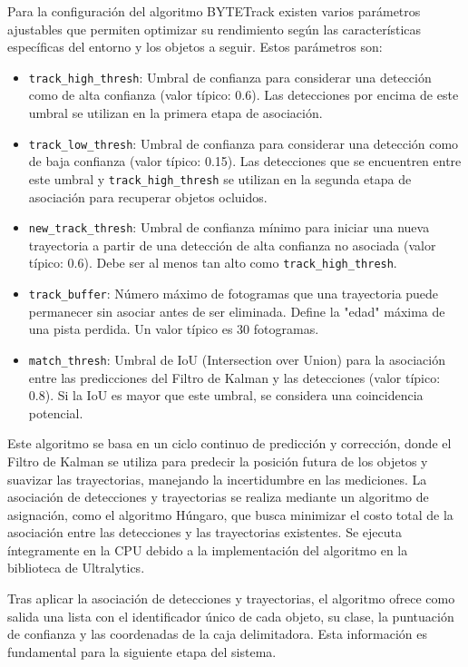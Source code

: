 \documentclass[11pt,spanish,listoffigures,listoftables]{tfgetsinf}
\begin{document}
Para la configuración del algoritmo BYTETrack existen varios parámetros ajustables que permiten optimizar su rendimiento según las características específicas del entorno y los objetos a seguir. Estos parámetros son:
\begin{itemize}
   \item \texttt{track\_high\_thresh}: Umbral de confianza para considerar una detección como de alta confianza (valor típico: 0.6). Las detecciones por encima de este umbral se utilizan en la primera etapa de asociación.
   \item \texttt{track\_low\_thresh}: Umbral de confianza para considerar una detección como de baja confianza (valor típico: 0.15). Las detecciones que se encuentren entre este umbral y \texttt{track\_high\_thresh} se utilizan en la segunda etapa de asociación para recuperar objetos ocluidos.
   \item \texttt{new\_track\_thresh}: Umbral de confianza mínimo para iniciar una nueva trayectoria a partir de una detección de alta confianza no asociada (valor típico: 0.6). Debe ser al menos tan alto como \texttt{track\_high\_thresh}.
   \item \texttt{track\_buffer}: Número máximo de fotogramas que una trayectoria puede permanecer sin asociar antes de ser eliminada. Define la "edad" máxima de una pista perdida. Un valor típico es 30 fotogramas.
   \item \texttt{match\_thresh}: Umbral de IoU (Intersection over Union) para la asociación entre las predicciones del Filtro de Kalman y las detecciones (valor típico: 0.8). Si la IoU es mayor que este umbral, se considera una coincidencia potencial.
\end{itemize}

Este algoritmo se basa en un ciclo continuo de predicción y corrección, donde el Filtro de Kalman se utiliza para predecir la posición futura de los objetos y suavizar las trayectorias, manejando la incertidumbre en las mediciones. La asociación de detecciones y trayectorias se realiza mediante un algoritmo de asignación, como el algoritmo Húngaro, que busca minimizar el costo total de la asociación entre las detecciones y las trayectorias existentes. Se ejecuta íntegramente en la CPU debido a la implementación del algoritmo en la biblioteca de Ultralytics.

Tras aplicar la asociación de detecciones y trayectorias, el algoritmo ofrece como salida una lista con el identificador único de cada objeto, su clase, la puntuación de confianza y las coordenadas de la caja delimitadora. Esta información es fundamental para la siguiente etapa del sistema.
\end{document}
